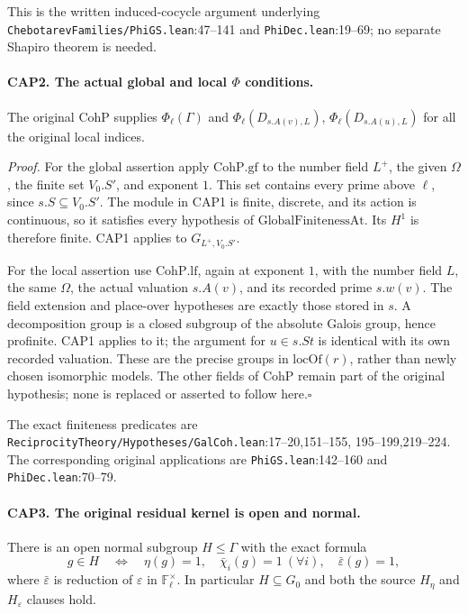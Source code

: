 This is the written induced-cocycle argument underlying
\nolinkurl{ChebotarevFamilies/PhiGS.lean}:47--141 and
\nolinkurl{PhiDec.lean}:19--69; no separate Shapiro theorem is needed.

\paragraph{CAP2. The actual global and local $\Phi$ conditions.}
\label{claim:CAP2}
The original $\mathrm{CohP}$ supplies $\Phi_\ell(\Gamma)$ and
$\Phi_\ell(D_{s.A(v),L})$, $\Phi_\ell(D_{s.A(u),L})$ for all the
original local indices.

\emph{Proof.}
For the global assertion apply $\mathrm{CohP.gf}$ to the number field
$L^+$, the given $\Omega$, the finite set $V_0.S'$, and exponent $1$.
This set contains every prime above $\ell$, since $s.S\subseteq V_0.S'$.
The module in CAP1 is finite, discrete, and its action is continuous,
so it satisfies every hypothesis of
$\mathrm{GlobalFinitenessAt}$.  Its $H^1$ is therefore finite.  CAP1
applies to $G_{L^+,V_0.S'}$.

For the local assertion use $\mathrm{CohP.lf}$, again at exponent $1$,
with the number field $L$, the same $\Omega$, the actual valuation
$s.A(v)$, and its recorded prime $s.w(v)$.  The field extension and
place-over hypotheses are exactly those stored in $s$.  A decomposition
group is a closed subgroup of the absolute Galois group, hence
profinite.  CAP1 applies to it; the argument for $u\in s.St$ is
identical with its own recorded valuation.  These are the precise groups
in $\mathrm{locOf}(r)$, rather than newly chosen isomorphic models.
The other fields of $\mathrm{CohP}$ remain part of the original
hypothesis; none is replaced or asserted to follow here.\hfill$\square$

The exact finiteness predicates are
\nolinkurl{ReciprocityTheory/Hypotheses/GalCoh.lean}:17--20,151--155,
195--199,219--224.  The corresponding original applications are
\nolinkurl{PhiGS.lean}:142--160 and \nolinkurl{PhiDec.lean}:70--79.

\paragraph{CAP3. The original residual kernel is open and normal.}
\label{claim:CAP3}
There is an open normal subgroup $H\leq\Gamma$ with the exact formula
\[
 g\in H\quad\Longleftrightarrow\quad
 \eta(g)=1,\quad\bar\chi_i(g)=1\ (\forall i),\quad
 \bar\varepsilon(g)=1,
 \tag{CAP.4}
\]
where $\bar\varepsilon$ is reduction of $\varepsilon$ in
$\mathbb F_\ell^\times$.  In particular $H\subseteq G_0$ and both
the source $H_\eta$ and $H_\varepsilon$ clauses hold.

